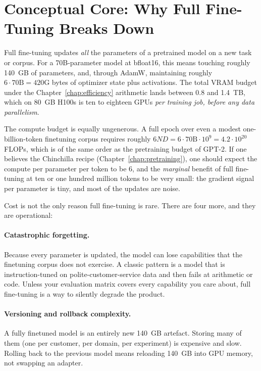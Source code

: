 \section{Conceptual Core: Why Full Fine-Tuning Breaks Down}

Full fine-tuning updates \emph{all} the parameters of a pretrained model on
a new task or corpus. For a 70B-parameter model at bfloat16, this means
touching roughly 140~GB of parameters, and, through AdamW, maintaining
roughly $6\cdot 70\text{B} = 420\text{G}$ bytes of optimizer state plus
activations.
The total VRAM budget under the Chapter~\ref{chap:efficiency} arithmetic lands between 0.8 and
1.4~TB, which on 80~GB H100s is ten to eighteen GPUs \emph{per training
job, before any data parallelism}.

The compute budget is equally ungenerous. A full epoch over even a
modest one-billion-token finetuning corpus requires roughly $6ND =
6\cdot 70\text{B}\cdot 10^9 = 4.2\cdot 10^{20}$ FLOPs, which is of the
same order as the pretraining budget of GPT-2.
If one believes the Chinchilla recipe (Chapter~\ref{chap:pretraining}), one should expect the
compute per parameter per token to be $6$, and the \emph{marginal}
benefit of full fine-tuning at ten or one hundred million tokens to be
very small: the gradient signal per parameter is tiny, and most of the
updates are noise.

Cost is not the only reason full fine-tuning is rare. There are four
more, and they are operational:

\paragraph{Catastrophic forgetting.}
Because every parameter is updated, the model can lose capabilities
that the finetuning corpus does not exercise. A classic pattern is a
model that is instruction-tuned on polite-customer-service data and
then fails at arithmetic or code. Unless your evaluation matrix covers
every capability you care about, full fine-tuning is a way to silently
degrade the product.

\paragraph{Versioning and rollback complexity.}
A fully finetuned model is an entirely new 140~GB artefact. Storing
many of them (one per customer, per domain, per experiment) is
expensive and slow. Rolling back to the previous model means
reloading 140~GB into GPU memory, not swapping an adapter.

